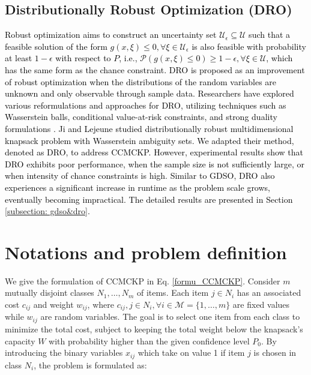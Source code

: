 \documentclass[lettersize,journal]{IEEEtran}
\begin{document}
\subsection{Distributionally Robust Optimization (DRO)}
\label{subsection:ro}
\textcolor{black}{
Robust optimization aims to construct an uncertainty set $\mathcal{U}_{\epsilon}\subseteq \mathcal{U}$ such that a feasible solution of the form $g(x,\xi)\leq 0, \forall \xi \in \mathcal{U}_{\epsilon}$ is also feasible with probability at least $1-\epsilon$ with respect to $P$, i.e., $\mathcal{P}(g(x,\xi)\leq 0)\geq 1-\epsilon, \forall \xi \in \mathcal{U}$, which has the same form as the chance constraint. 
DRO is proposed as an improvement of robust optimization when the distributions of the random variables are unknown and only observable through sample data.
Researchers have explored various reformulations and approaches for DRO, utilizing techniques such as Wasserstein balls, conditional value-at-risk constraints, and strong duality formulations \cite{mohajerin2018data,xie2021distributionally,ji2021data,gao2022distributionally}.
Ji and Lejeune \cite{ji2021data} studied distributionally robust multidimensional knapsack problem with Wasserstein ambiguity sets.
We adapted their method, denoted as DRO, to address CCMCKP.
However, experimental results show that DRO exhibits poor performance, when the sample size is not sufficiently large, or when intensity of chance constraints is high.
Similar to GDSO, DRO also experiences a significant increase in runtime as the problem scale grows, eventually becoming impractical.
The detailed results are presented in Section \ref{subsection: gdso&dro}.
}

\section{Notations and problem definition}
\label{section:np}
We give the formulation of CCMCKP in Eq. \ref{formu_CCMCKP}. 
Consider $m$ mutually disjoint classes $N_1,\ldots,N_m$ of items. 
Each item $j\in N_i$ has an associated cost $c_{ij}$ and weight $w_{ij}$, where $c_{ij}, j\in N_i, \forall i\in \mathcal{M}=\{1,\ldots,m\}$ are fixed values while $w_{ij}$ are random variables. 
The goal is to select one item from each class to minimize the total cost, subject to keeping the total weight below the knapsack’s capacity $W$ with probability higher than the given confidence level $P_0$.
By introducing the binary variables $x_{ij}$ which take on value 1 if item $j$ is chosen in class $N_i$, the problem is formulated as:
\end{document}
